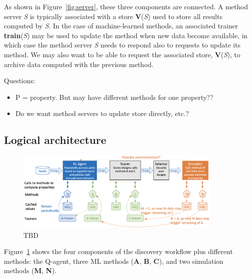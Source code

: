\documentclass[10pt]{article}
\begin{document}
As shown in Figure~\ref{fig:server}, these three components are connected. 
A method server \emph{S} is typically associated with a store \textbf{V}(\emph{S}) used to store all results computed by \emph{S}.
In the case of machine-learned methods, an associated trainer \textbf{train}(\emph{S}) may be used to update the method when new data become available,
in which case the method server \emph{S} needs to respond also to requests to update its method.
We may also want to be able to request the associated store, \textbf{V}(\emph{S}), to archive data computed with the previous method.


Questions:
\begin{itemize}
\item
P = property. But may have different methods for one property??
\item
Do we want method servers to update store directly, etc.?
\end{itemize}


\subsection{Logical architecture}

\begin{figure}
  \centering
  \includegraphics[width=0.9\textwidth,trim=0in 0in 0in 0in,clip]{./Figs/sketch.png}
  \vspace{-1.5ex}
  \caption{TBD}
\label{fig:sketch}
\end{figure}



Figure~\ref{fig:sketch} shows the four components of the discovery workflow plus different methods: 
the Q-agent, three ML methods (\textbf{A}, \textbf{B}, \textbf{C}), and two simulation methods (\textbf{M}, \textbf{N}).
\end{document}
